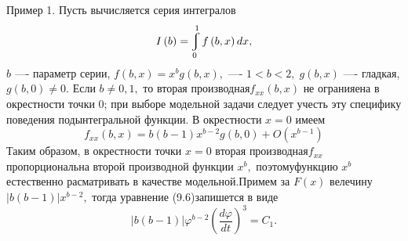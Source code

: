 \documentclass[twoside]{article}
\begin{document}
П\hspace{3pt}р\hspace{3pt}и\hspace{3pt}м\hspace{3pt}е\hspace{3pt}р 1. Пусть вычисляется серия интегралов
$$
I\left( b\right) =\varint\limits ^{1}_{0}f\left( b,x\right) dx,
$$
$b$ —- параметр серии, $f\left( b,x\right) =x^{b}g\left( b,x\right) ,$ —- $1 <b <2,\; g\left( b,x\right)$ —-\linebreak
гладкая, $g\left( b,0\right) \neq 0.$ Если $b\neq 0,1,$ то вторая производная\linebreak $f_{xx}\left( b,x\right)$ не огранияена в окрестности точки 0; при выборе модельной
задачи следует учесть эту специфику поведения подынтегральной функции. В окрестности $x=0$ имеем
$$
f_{xx}\left( b,x\right) =b\left( b-1\right) x^{b-2}g\left( b,0\right) +O\left( x^{b-1}\right)
$$
Таким образом, в окрестности точки $x=0$ вторая производная\linebreak $f_{xx}$ пропорциональна второй производной функции $x^b,$
поэтому\linebreak функцию $x^b$ естественно расматривать в качестве модельной.\linebreak Примем за $F(x)$ велечину 
$\left| b\left( b-1\right) \right| x^{b-2},$ тогда уравнение (9.6)\linebreak запишется в виде
$$
\left| b\left( b-1\right) \right| \varphi ^{b-2}\left( \dfrac {d\varphi }{dt}\right) ^{3}=C_{1}.
$$
\end{document}

